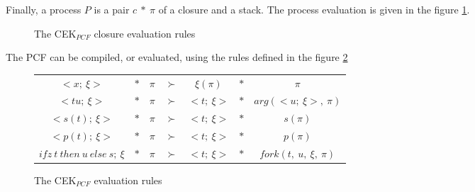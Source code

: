 \documentclass[a4paper,12pt]{article}
\begin{document}
Finally, a process $P$ is a pair $c~*~\pi$ of a closure and a stack. The process
evaluation is given in the figure \ref{cek-eval-closure}.

\begin{figure}[!ht]
  \begin{center}
  \end{center}
  \caption{The CEK$_{PCF}$ closure evaluation rules}
  \label{cek-eval-closure}
\end{figure}


The PCF can be compiled, or evaluated, using the rules defined in the figure \ref{cek-eval-rules}

\begin{figure}[!ht]
  \begin{center}
    \begin{tabular}{|c c c c c c c|}
      \hline
      $<x;~\xi>$ & $*$ & $\pi$ & $\succ$ & $\xi(\pi)$ & $*$ & $\pi$ \\
      $<tu;~\xi>$ & $*$ & $\pi$ & $\succ$ & $<t;~\xi>$ & $*$ & 
      $arg(<u;~\xi>,~\pi)$ \\
      $<s(t);~\xi>$ & $*$ & $\pi$ & $\succ$ & $<t;~\xi>$ & $*$ & 
      $s(\pi)$ \\
      $<p(t);~\xi>$ & $*$ & $\pi$ & $\succ$ & $<t;~\xi>$ & $*$ & 
      $p(\pi)$ \\
      $ifz~t~then~u~else~s;~\xi$ 
      & $*$ & $\pi$ & $\succ$ & $<t;~\xi>$ & $*$ & 
      $fork(t,~u,~\xi,~\pi)$ \\
      \hline
    \end{tabular}
  \end{center}
  \caption{The CEK$_{PCF}$ evaluation rules}
  \label{cek-eval-rules}
\end{figure}
\end{document}
